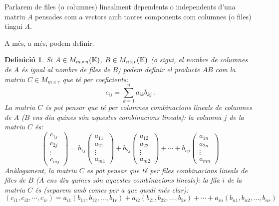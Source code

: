 \documentclass[
  11pt,
]{book}
\numberwithin{dummy}{section}
\theoremstyle{maincolornumbox}
\theoremstyle{blacknumex}
\theoremstyle{blacknumbox}
\newtheorem{definitionT}{Definició}[chapter]
\theoremstyle{maincolornum}
\newenvironment{definition}{\begin{dBox}\begin{definitionT}}{\end{definitionT}\end{dBox}}
\begin{document}
Parlarem de files (o columnes) linealment dependents o independents
d'una matriu \(A\) pensades com a vectors amb tantes components com
columnes (o files) tingui \(A\).

A més, a més, podem definir:

\begin{definition}
Si \(A \in M_{m\times n}(\mathbb{K})\), \(B \in M_{n\times r}(\mathbb{K})\) (o sigui, el
nombre de columnes de \(A\) és igual al nombre de files de \(B\)) podem
definir el \emph{producte \(AB\)} com la matriu \(C\in M_{m\times r}\) que té per
coeficients: \[c_{ij}=\sum_{k=1}^{n} a_{ik}b_{kj} \,.\] La matriu \(C\) és
pot pensar que té per columnes combinacions lineals de columnes de \(A\)
(\(B\) ens diu quines són aquestes combinacions lineals): la columna \(j\)
de la matriu \(C\) és: \[\begin{pmatrix}
    c_{1j}\\c_{2j}\\ \vdots \\ c_{mj} 
    \end{pmatrix} =
    b_{1j}  \begin{pmatrix}
    a_{11}\\a_{21}\\ \vdots \\ a_{m1} 
    \end{pmatrix} +
    b_{2j}  \begin{pmatrix}
    a_{12}\\a_{22}\\ \vdots \\ a_{m2} 
    \end{pmatrix} + \cdots +
    b_{nj}  \begin{pmatrix}
    a_{1n}\\a_{2n}\\ \vdots \\ a_{mn} 
    \end{pmatrix}\] Anàlogament, la matriu \(C\) es pot pensar que té per
files combinacions lineals de files de \(B\) (\(A\) ens diu quines són
aquestes combinacions lineals): la fila \(i\) de la matriu \(C\) és (separem
amb comes per a que quedi més clar): \[(c_{i1},c_{i2},\cdots,c_{ir})=
    a_{i1} (b_{11},b_{12},\dots,b_{1r})+
    a_{i2} (b_{21},b_{22},\dots,b_{2r})+ \cdots +
    a_{in} (b_{n1},b_{n2},\dots,b_{nr})\]
\end{definition}
\end{document}
